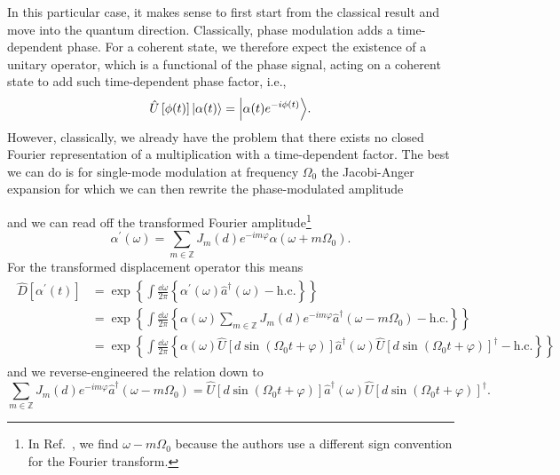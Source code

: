 
In this particular case, it makes sense to first start from the classical result and move into the quantum direction.
Classically, phase modulation adds a time-dependent phase.
For a coherent state, we therefore expect the existence of a unitary operator, which is a functional of the phase signal, acting on a coherent state to add such time-dependent phase factor, i.e.,
\begin{equation}
	\hat{U}\left[\phi(t)\right]
	\ket*{\alpha(t)}
	=
	\ket*{\alpha(t)e^{-i\phi(t)}}
	.
\end{equation}
However, classically, we already have the problem that there exists no closed Fourier representation of a multiplication with a time-dependent factor.
The best we can do is for single-mode modulation at frequency $\Omega_0$ the Jacobi-Anger expansion for which we can then rewrite the phase-modulated amplitude

and we can read off the transformed Fourier amplitude\footnote{In Ref.~\cite{Horoshko2018}, we find $\omega-m\Omega_0$ because the authors use a different sign convention for the Fourier transform.}
\begin{equation}
	\alpha^\prime(\omega)
	=
	\sum_{m\in\mathbb{Z}}
	J_m(d)
	e^{-im\varphi}
	\alpha(\omega+m\Omega_0)
	.
\end{equation}
For the transformed displacement operator this means
\begin{align}
	\begin{split}
		\hat{D}\left[\alpha^\prime(t)\right]
		&=
		\exp\left\{
			\int\frac{\dd{\omega}}{2\pi}
			\left\{
				\alpha^\prime(\omega)
				\hat{a}^\dagger(\omega)
				-
				\text{h.c.}
			\right\}
		\right\}
		\\
		&=
		\exp\left\{
			\int\frac{\dd{\omega}}{2\pi}
			\left\{
				\alpha(\omega)
				\sum_{m\in\mathbb{Z}}
				J_m(d)
				e^{-im\varphi}
				\hat{a}^\dagger(\omega-m\Omega_0)
				-
				\text{h.c.}
			\right\}
		\right\}
		\\
		&=
		\exp\left\{
			\int\frac{\dd{\omega}}{2\pi}
			\left\{
				\alpha(\omega)
				\hat{U}\left[d\sin(\Omega_0t+\varphi)\right]
				\hat{a}^\dagger(\omega)
				\hat{U}\left[d\sin(\Omega_0t+\varphi)\right]^\dagger
				-
				\text{h.c.}
			\right\}
		\right\}
	\end{split}	
\end{align}
and we reverse-engineered the relation down to
\begin{equation}
	\sum_{m\in\mathbb{Z}}
	J_m(d)
	e^{-im\varphi}
	\hat{a}^\dagger(\omega-m\Omega_0)
	=
	\hat{U}\left[d\sin(\Omega_0t+\varphi)\right]
	\hat{a}^\dagger(\omega)
	\hat{U}\left[d\sin(\Omega_0t+\varphi)\right]^\dagger
	.
\end{equation}

